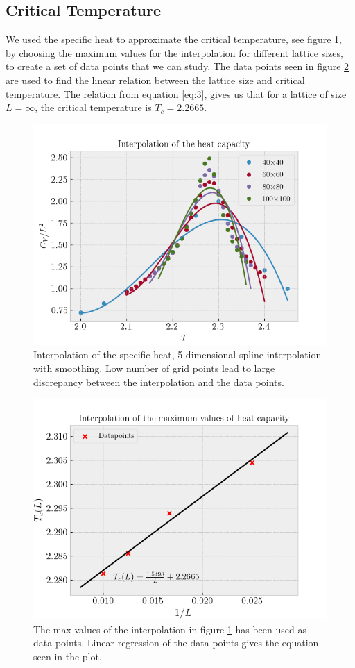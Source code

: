 \documentclass[%
reprint,
nofootinbib,
amsmath,amssymb,
aps,
]{revtex4-1}
\begin{document}
\subsection{Critical Temperature} %
We used the specific heat to approximate the critical temperature, see figure \ref{fig:InterpolationCv}, by choosing the maximum values for the interpolation for different lattice sizes, to create a set of data points that we can study. The data points seen in figure \ref{fig:ApproxTc} are used to find the linear relation between the lattice size and critical temperature. The relation from equation \eqref{eq:3}, gives us that for a lattice of size $L = \infty$, the critical temperature is $T_c = 2.2665$. 
\begin{figure}
	\centering
	\includegraphics[width=0.95\linewidth]{./figures/InterpolationCv.png}
	\caption{Interpolation of the specific heat, 5-dimensional spline interpolation with smoothing. Low number of grid points lead to large discrepancy between the interpolation and the data points.}
	\label{fig:InterpolationCv}
\end{figure}
\begin{figure}
	\centering
	\includegraphics[width=0.95\linewidth]{./figures/ApproxTc.png}
	\caption{The max values of the interpolation in figure \ref{fig:InterpolationCv} has been used as data points. Linear regression of the data points gives the equation seen in the plot.}
	\label{fig:ApproxTc}
\end{figure}
\end{document}
